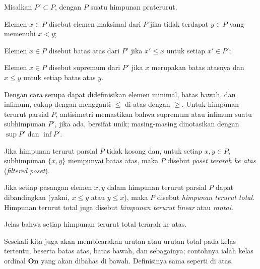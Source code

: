 \begin{definition}\label{def:max-sup}
	Misalkan $P' \subset P$, dengan $P$ suatu himpunan praterurut.
	\begin{compactitem}
		\item Elemen $x \in P$ disebut elemen maksimal dari $P$ jika tidak terdapat $y \in P$ yang memenuhi $x < y$;
		\item Elemen $x \in P$ disebut batas atas dari $P'$ jika $x' \leq x$ untuk setiap $x' \in P'$;
		\item Elemen $x \in P$ disebut supremum dari $P'$ jika $x$ merupakan batas atasnya dan $x \leq y$ untuk setiap batas atas $y$.
	\end{compactitem}
	Dengan cara serupa dapat didefinisikan elemen minimal, batas bawah, dan infimum, cukup dengan mengganti $\leq$ di atas dengan $\geq$. Untuk himpunan terurut parsial $P$, antisimetri memastikan bahwa supremum atau infimum suatu subhimpunan $P'$, jika ada, bersifat unik; masing-masing dinotasikan dengan $\sup P'$ dan $\inf P'$. 
\end{definition}

\begin{definition}\label{def:filtrant-poset}
	Jika himpunan terurut parsial $P$ tidak kosong dan, untuk setiap $x,y \in P$, subhimpunan $\{x,y\}$ mempunyai batas atas, maka $P$ disebut \emph{poset terarah ke atas} (\emph{filtered poset}).
\end{definition}

\begin{definition}
	Jika setiap pasangan elemen $x,y$ dalam himpunan terurut parsial $P$ dapat dibandingkan (yakni, $x \leq y$ atau $y \leq x$), maka $P$ disebut \emph{himpunan terurut total}. Himpunan terurut total juga disebut \emph{himpunan terurut linear} atau \emph{rantai}.
\end{definition}
Jelas bahwa setiap himpunan terurut total terarah ke atas.

Sesekali kita juga akan membicarakan urutan atau urutan total pada kelas tertentu, beserta batas atas, batas bawah, dan sebagainya; contohnya ialah kelas ordinal $\textbf{On}$ yang akan dibahas di bawah. Definisinya sama seperti di atas.

